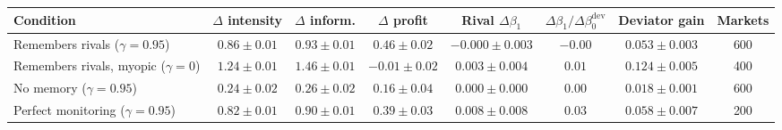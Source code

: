 \begin{tabular}{lccccccc}
\toprule
Condition & $\Delta$ intensity & $\Delta$ inform. & $\Delta$ profit & Rival $\Delta\beta_1$ & $\Delta\beta_1/\Delta\beta^{\mathrm{dev}}_0$ & Deviator gain & Markets \\
\midrule
Remembers rivals ($\gamma=0.95$) & $0.86 \pm 0.01$ & $0.93 \pm 0.01$ & $0.46 \pm 0.02$ & $-0.000 \pm 0.003$ & $-0.00$ & $0.053 \pm 0.003$ & 600 \\
Remembers rivals, myopic ($\gamma=0$) & $1.24 \pm 0.01$ & $1.46 \pm 0.01$ & $-0.01 \pm 0.02$ & $0.003 \pm 0.004$ & $0.01$ & $0.124 \pm 0.005$ & 400 \\
No memory ($\gamma=0.95$) & $0.24 \pm 0.02$ & $0.26 \pm 0.02$ & $0.16 \pm 0.04$ & $0.000 \pm 0.000$ & $0.00$ & $0.018 \pm 0.001$ & 600 \\
Perfect monitoring ($\gamma=0.95$) & $0.82 \pm 0.01$ & $0.90 \pm 0.01$ & $0.39 \pm 0.03$ & $0.008 \pm 0.008$ & $0.03$ & $0.058 \pm 0.007$ & 200 \\
\bottomrule
\end{tabular}